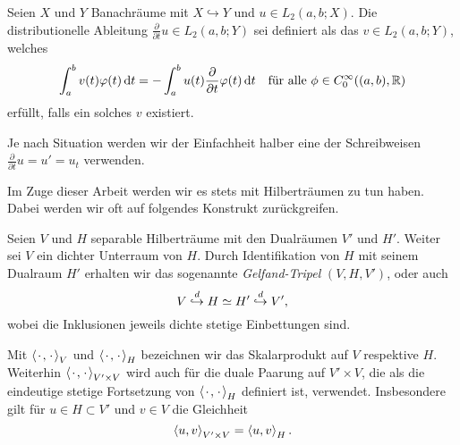 \begin{Definition}
\label{definition:gl:schwache_zeitableitung}
    Seien $X$ und $Y$ Banachräume mit $X \hookrightarrow Y$ und $u \in L_{2}(a, b; X)$.
    Die distributionelle Ableitung $\frac{\partial}{\partial t} u \in L_{2}(a, b; Y)$ sei definiert als das $v \in L_{2}(a, b; Y)$, welches
    \begin{equation}
        \int_{a}^{b} v(t) \varphi(t) \diff t = - \int_{a}^{b} u(t) \frac{\partial}{\partial t} \varphi(t) \diff t \quad \fa \phi \in C^{\infty}_{0}((a, b), \mathbb{R})
    \end{equation}
    erfüllt, falls ein solches $v$ existiert.
\end{Definition}

\begin{Bemerkung}
    Je nach Situation werden wir der Einfachheit halber eine der Schreibweisen $\frac{\partial}{\partial t} u = u' = u_{t}$ verwenden.
\end{Bemerkung}

Im Zuge dieser Arbeit werden wir es stets mit Hilberträumen zu tun haben.
Dabei werden wir oft auf folgendes Konstrukt zurückgreifen.

\begin{Definition}
\label{definition:gl:gelfand_tripel}
    Seien $V$ und $H$ separable Hilberträume mit den Dualräumen $V'$ und $H'$.
    Weiter sei $V$ ein dichter Unterraum von $H$.
    Durch Identifikation von $H$ mit seinem Dualraum $H'$ erhalten wir das sogenannte \emph{Gelfand-Tripel} $(V, H, V')$, oder auch
    \begin{equation}
        V \denseinclusion H \simeq H' \denseinclusion V',
    \end{equation}
    wobei die Inklusionen jeweils dichte stetige Einbettungen sind.
\end{Definition}

\begin{Bemerkung}
    Mit $\skprod{\blank}{\blank}_{V}$ und $\skprod{\blank}{\blank}_{H}$ bezeichnen wir das Skalarprodukt auf $V$ respektive $H$.
    Weiterhin $\skprod{\blank}{\blank}_{V' \times V}$ wird auch für die duale Paarung auf $V' \times V$, die als die eindeutige stetige Fortsetzung von $\skprod{\blank}{\blank}_{H}$ definiert ist, verwendet.
    Insbesondere gilt für $u \in H \subset V'$ und $v \in V$ die Gleichheit
    \begin{equation}
        \skprod{u}{v}_{V' \times V} = \skprod{u}{v}_{H}.
    \end{equation}
\end{Bemerkung}

